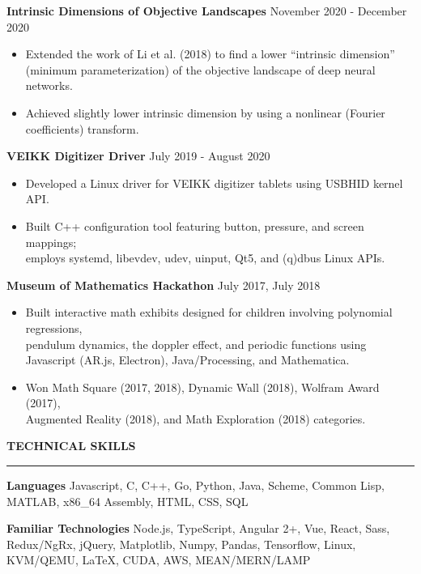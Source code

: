 \documentclass[]{article}
\newcommand{\br}{\vspace{12pt}}
\newcommand{\brs}{\vspace{3pt}}
\newcommand{\hr}{\brs\hrule\brs}
\begin{document}
\textbf{Intrinsic Dimensions of Objective Landscapes}
\hfill
November 2020 - December 2020
\begin{itemize}
\item Extended the work of Li et al. (2018) to find a lower ``intrinsic
  dimension'' \\ (minimum parameterization) of the objective landscape of deep
  neural networks.
\item Achieved slightly lower intrinsic dimension by using a nonlinear (Fourier
  coefficients) transform.
\end{itemize}

\brs

\textbf{VEIKK Digitizer Driver}
\hfill
July 2019 - August 2020
\begin{itemize}
\item Developed a Linux driver for VEIKK digitizer tablets using USBHID kernel
  API.
\item Built C++ configuration tool featuring button, pressure, and screen
  mappings; \\
  employs systemd, libevdev, udev, uinput, Qt5, and (q)dbus Linux APIs.
\end{itemize}

\brs

\textbf{Museum of Mathematics Hackathon}
\hfill
July 2017, July 2018
\begin{itemize}
\item Built interactive math exhibits designed for children involving polynomial
  regressions, \\ pendulum dynamics, the doppler effect, and periodic functions
  using \\ Javascript (AR.js, Electron), Java/Processing, and Mathematica.
\item Won Math Square (2017, 2018), Dynamic Wall (2018), Wolfram Award (2017),
  \\ Augmented Reality (2018), and Math Exploration (2018) categories.
\end{itemize}

\br

\textbf{TECHNICAL SKILLS}
\hr

\textbf{Languages} Javascript, C, C++, Go, Python, Java, Scheme, Common Lisp,
MATLAB, x86\_64 Assembly, HTML, CSS, SQL

\brs

\textbf{Familiar Technologies} Node.js, TypeScript, Angular 2+, Vue, React,
Sass, Redux/NgRx, jQuery, Matplotlib, Numpy, Pandas, Tensorflow, Linux,
KVM/QEMU, \LaTeX, CUDA, AWS, MEAN/MERN/LAMP
\end{document}
